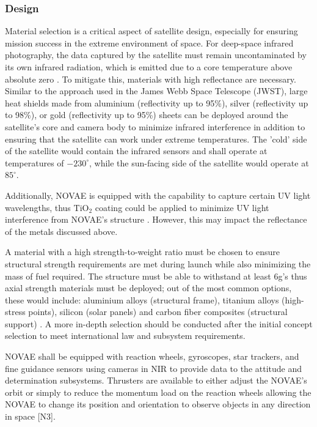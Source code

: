 \vspace{1.5mm}
\subsubsection{Design}
Material selection is a critical aspect of satellite design, especially for ensuring mission success in the extreme environment of space. For deep-space infrared photography, the data captured by the satellite must remain uncontaminated by its own infrared radiation, which is emitted due to a core temperature above absolute zero \cite{cengel2014thermodynamics}. To mitigate this, materials with high reflectance are necessary. Similar to the approach used in the James Webb Space Telescope (JWST), large heat shields made from aluminium (reflectivity up to 95\%), silver (reflectivity up to 98\%), or gold (reflectivity up to 95\%) sheets can be deployed around the satellite’s core and camera body to minimize infrared interference \cite{spacecraftThermalControl} in addition to ensuring that the satellite can work under extreme temperatures. The 'cold' side of the satellite would contain the infrared sensors and shall operate at temperatures of $-230^{\circ}$, while the sun-facing side of the satellite would operate at $85^{\circ}$.
\vspace{1.5mm}

Additionally, NOVAE is equipped with the capability to capture certain UV light wavelengths, thus $\text{TiO}_2$ coating could be applied to minimize UV light interference from NOVAE’s structure \cite{bunte2005materials}. However, this may impact the reflectance of the metals discussed above.
\vspace{1.5mm}

A material with a high strength-to-weight ratio must be chosen to ensure structural strength requirements are met during launch while also minimizing the mass of fuel required. The structure must be able to withstand at least 6g's thus axial strength materials must be deployed; out of the most common options, these would include: aluminium alloys (structural frame), titanium alloys (high-stress points), silicon (solar panels) and carbon fiber composites (structural support) \cite{materialschoices}. A more in-depth selection should be conducted after the initial concept selection to meet international law and subsystem requirements. 
\vspace{1.5mm}

NOVAE shall be equipped with reaction wheels, gyroscopes, star trackers, and fine guidance sensors using cameras in NIR to provide data to the attitude and determination subsystems. Thrusters are available to either adjust the NOVAE's orbit or simply to reduce the momentum load on the reaction wheels allowing the NOVAE to change its position and orientation to observe objects in any direction in space [N3]. 

